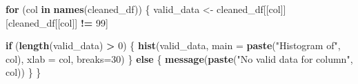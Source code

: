 \documentclass[
]{article}
\newenvironment{Shaded}{\begin{snugshade}}{\end{snugshade}}
\newcommand{\AttributeTok}[1]{\textcolor[rgb]{0.13,0.29,0.53}{#1}}
\newcommand{\ControlFlowTok}[1]{\textcolor[rgb]{0.13,0.29,0.53}{\textbf{#1}}}
\newcommand{\DecValTok}[1]{\textcolor[rgb]{0.00,0.00,0.81}{#1}}
\newcommand{\FunctionTok}[1]{\textcolor[rgb]{0.13,0.29,0.53}{\textbf{#1}}}
\newcommand{\NormalTok}[1]{#1}
\newcommand{\OtherTok}[1]{\textcolor[rgb]{0.56,0.35,0.01}{#1}}
\newcommand{\SpecialCharTok}[1]{\textcolor[rgb]{0.81,0.36,0.00}{\textbf{#1}}}
\newcommand{\StringTok}[1]{\textcolor[rgb]{0.31,0.60,0.02}{#1}}
\begin{document}
\begin{Shaded}
\begin{Highlighting}[]
\ControlFlowTok{for}\NormalTok{ (col }\ControlFlowTok{in} \FunctionTok{names}\NormalTok{(cleaned\_df)) \{}
\NormalTok{    valid\_data }\OtherTok{\textless{}{-}}\NormalTok{ cleaned\_df[[col]][cleaned\_df[[col]] }\SpecialCharTok{!=} \DecValTok{99}\NormalTok{]}

    \ControlFlowTok{if}\NormalTok{ (}\FunctionTok{length}\NormalTok{(valid\_data) }\SpecialCharTok{\textgreater{}} \DecValTok{0}\NormalTok{) \{}
        \FunctionTok{hist}\NormalTok{(valid\_data, }\AttributeTok{main =} \FunctionTok{paste}\NormalTok{(}\StringTok{"Histogram of"}\NormalTok{, col), }\AttributeTok{xlab =}\NormalTok{ col, }\AttributeTok{breaks=}\DecValTok{30}\NormalTok{)}
\NormalTok{    \} }\ControlFlowTok{else}\NormalTok{ \{}
        \FunctionTok{message}\NormalTok{(}\FunctionTok{paste}\NormalTok{(}\StringTok{"No valid data for column"}\NormalTok{, col))}
\NormalTok{    \}}
\NormalTok{\}}
\end{Highlighting}
\end{Shaded}
\end{document}
